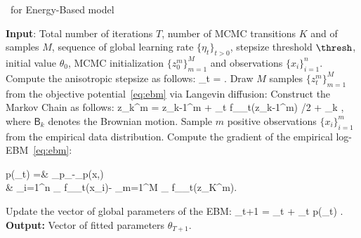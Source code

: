 \documentclass{article} %
\begin{document}
\begin{algorithm}[t]
\caption{\algo\ for Energy-Based model} \label{alg:anila}
\begin{algorithmic}[1]
\STATE \textbf{Input}: Total number of iterations $T$, number of MCMC transitions $K$ and of samples $M$, sequence of global learning rate $\{\eta_t\}_{t >0}$, stepsize threshold $\thresh$, initial value $\theta_0$, MCMC initialization $\{ z_{0}^m \}_{m=1}^M$ and observations $\{ x_{i} \}_{i=1}^n$.
\STATE Compute the anisotropic stepsize as follows: \label{line:step}
\beq\label{eq:step}
\stepsize_t =  \eqsp.
\eeq
\STATE Draw $M$ samples $\{ z_{t}^m \}_{m=1}^M$ from the objective potential~\eqref{eq:ebm} via Langevin diffusion:\label{line:langevin}
\STATE Construct the Markov Chain as follows:
\beq\label{eq:anila}
z_{k}^{m} = z_{k-1}^m + \stepsize_t  \nabla f_{\theta_t}(z_{k-1}^m) /2 +  _k \eqsp,
\eeq
where $\mathsf{B}_k$ denotes the Brownian motion.
\ENDFOR
\STATE Sample $m$ positive observations $\{ x_{i} \}_{i=1}^m$ from the empirical data distribution.
\STATE Compute the gradient of the empirical log-EBM~\eqref{eq:ebm}:
\beq\notag
\begin{split}
\nabla \log p(\theta_t) 
 =& _{p_{}}-_{p(x,\theta)}\\
 &\hspace{-0.6in}\approx  {} \sum_{i=1}^{n} \nabla_{\theta} f_{\theta_t}\left(x_{i}\right)- \sum_{m=1}^{M} \nabla_{\theta} f_{\theta_t}\left(z_K^m\right)\eqsp.
\end{split}
\eeq
\STATE Update the vector of global parameters of the EBM:\label{line:gradient}
\beq\notag
\theta_{t+1} = \theta_{t} + \eta_t \nabla \log p(\theta_t) \eqsp.
\eeq
\ENDFOR
\STATE \textbf{Output:} Vector of fitted parameters $\theta_{T+1}$.
\end{algorithmic}
\end{algorithm}
\end{document}
